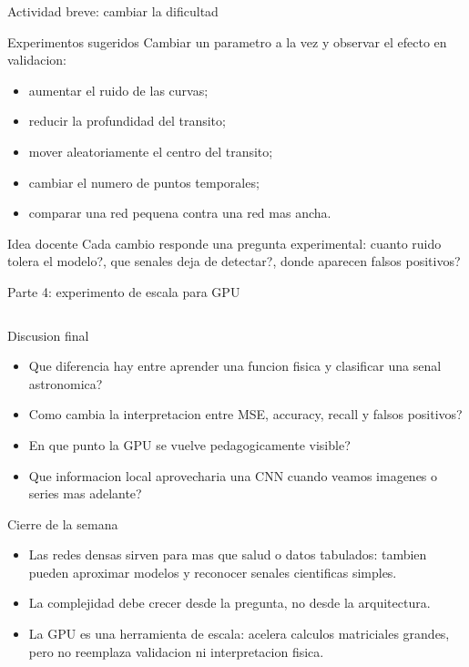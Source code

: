 \begin{frame}{Actividad breve: cambiar la dificultad}
\begin{block}{Experimentos sugeridos}
Cambiar un parametro a la vez y observar el efecto en validacion:
\end{block}
\begin{itemize}
    \item aumentar el ruido de las curvas;
    \item reducir la profundidad del transito;
    \item mover aleatoriamente el centro del transito;
    \item cambiar el numero de puntos temporales;
    \item comparar una red pequena contra una red mas ancha.
\end{itemize}
\begin{alertblock}{Idea docente}
Cada cambio responde una pregunta experimental: cuanto ruido tolera el modelo?, que senales deja de detectar?, donde aparecen falsos positivos?
\end{alertblock}
\end{frame}

\begin{frame}[fragile]{Parte 4: experimento de escala para GPU}
\inputminted{python}{codes/clase2-p4.py}
\end{frame}

\begin{frame}{Discusion final}
\begin{itemize}
    \item Que diferencia hay entre aprender una funcion fisica y clasificar una senal astronomica?
    \item Como cambia la interpretacion entre MSE, accuracy, recall y falsos positivos?
    \item En que punto la GPU se vuelve pedagogicamente visible?
    \item Que informacion local aprovecharia una CNN cuando veamos imagenes o series mas adelante?
\end{itemize}
\end{frame}

\begin{frame}{Cierre de la semana}
\begin{itemize}
    \item Las redes densas sirven para mas que salud o datos tabulados: tambien pueden aproximar modelos y reconocer senales cientificas simples.
    \item La complejidad debe crecer desde la pregunta, no desde la arquitectura.
    \item La GPU es una herramienta de escala: acelera calculos matriciales grandes, pero no reemplaza validacion ni interpretacion fisica.
\end{itemize}
\end{frame}


